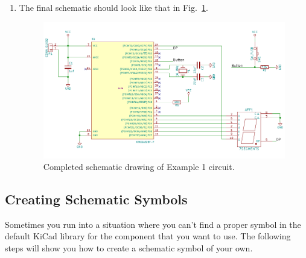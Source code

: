 \documentclass[12pt,letterpaper]{scrartcl}
\begin{document}
\begin{enumerate}
	\item The final schematic should look like that in Fig.~\ref{fig:example1-schematic-final}.
		\begin{figure}[h]
			\centering
			\includegraphics{example1-schematic-final}
			\caption{Completed schematic drawing of Example 1 circuit.}
			\label{fig:example1-schematic-final}
		\end{figure}		
\end{enumerate}

\newpage
\subsection{Creating Schematic Symbols}
Sometimes you run into a situation where you can’t find a proper symbol in the default KiCad library for the component that you want to use. The following steps will show you how to create a schematic symbol of your own. 
\end{document}

